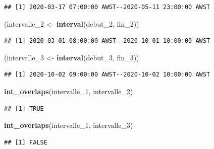 \documentclass[
  11pt,
]{book}
\newenvironment{Shaded}{\begin{snugshade}}{\end{snugshade}}
\newcommand{\DecValTok}[1]{\textcolor[rgb]{0.00,0.00,0.81}{#1}}
\newcommand{\KeywordTok}[1]{\textcolor[rgb]{0.13,0.29,0.53}{\textbf{#1}}}
\newcommand{\NormalTok}[1]{#1}
\newcommand{\StringTok}[1]{\textcolor[rgb]{0.31,0.60,0.02}{#1}}
\numberwithin{equation}{section}
\numberwithin{countremarque}{section}
\begin{document}
\begin{lstlisting}
## [1] 2020-03-17 07:00:00 AWST--2020-05-11 23:00:00 AWST
\end{lstlisting}

\begin{Shaded}
\begin{Highlighting}[]
\NormalTok{(intervalle\_}\DecValTok{2}\NormalTok{ \textless{}{-}}\StringTok{ }\KeywordTok{interval}\NormalTok{(debut\_}\DecValTok{2}\NormalTok{, fin\_}\DecValTok{2}\NormalTok{))}
\end{Highlighting}
\end{Shaded}

\begin{lstlisting}
## [1] 2020-03-01 08:00:00 AWST--2020-10-01 10:00:00 AWST
\end{lstlisting}

\begin{Shaded}
\begin{Highlighting}[]
\NormalTok{(intervalle\_}\DecValTok{3}\NormalTok{ \textless{}{-}}\StringTok{ }\KeywordTok{interval}\NormalTok{(debut\_}\DecValTok{3}\NormalTok{, fin\_}\DecValTok{3}\NormalTok{))}
\end{Highlighting}
\end{Shaded}

\begin{lstlisting}
## [1] 2020-10-02 09:00:00 AWST--2020-10-02 10:00:00 AWST
\end{lstlisting}

\begin{Shaded}
\begin{Highlighting}[]
\KeywordTok{int\_overlaps}\NormalTok{(intervalle\_}\DecValTok{1}\NormalTok{, intervalle\_}\DecValTok{2}\NormalTok{)}
\end{Highlighting}
\end{Shaded}

\begin{lstlisting}
## [1] TRUE
\end{lstlisting}

\begin{Shaded}
\begin{Highlighting}[]
\KeywordTok{int\_overlaps}\NormalTok{(intervalle\_}\DecValTok{1}\NormalTok{, intervalle\_}\DecValTok{3}\NormalTok{)}
\end{Highlighting}
\end{Shaded}

\begin{lstlisting}
## [1] FALSE
\end{lstlisting}
\end{document}
